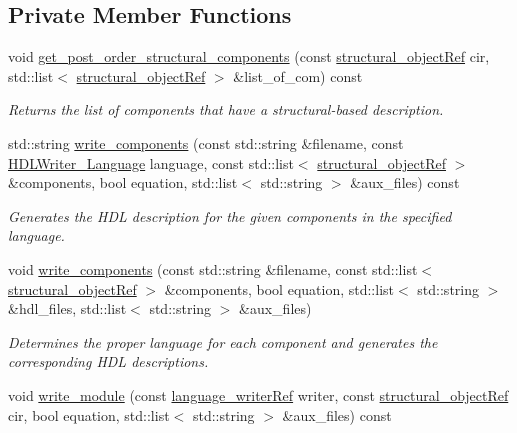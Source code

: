\subsection*{Private Member Functions}
\begin{DoxyCompactItemize}
\item 
void \hyperlink{classHDL__manager_a5f8b1b3812244b35f3d58f639903e3d8}{get\+\_\+post\+\_\+order\+\_\+structural\+\_\+components} (const \hyperlink{structural__objects_8hpp_a8ea5f8cc50ab8f4c31e2751074ff60b2}{structural\+\_\+object\+Ref} cir, std\+::list$<$ \hyperlink{structural__objects_8hpp_a8ea5f8cc50ab8f4c31e2751074ff60b2}{structural\+\_\+object\+Ref} $>$ \&list\+\_\+of\+\_\+com) const
\begin{DoxyCompactList}\small\item\em Returns the list of components that have a structural-\/based description. \end{DoxyCompactList}\item 
std\+::string \hyperlink{classHDL__manager_aaaf408848659946f286bce9799a7da8a}{write\+\_\+components} (const std\+::string \&filename, const \hyperlink{language__writer_8hpp_a890069761ca3ce361c42684c789d886c}{H\+D\+L\+Writer\+\_\+\+Language} language, const std\+::list$<$ \hyperlink{structural__objects_8hpp_a8ea5f8cc50ab8f4c31e2751074ff60b2}{structural\+\_\+object\+Ref} $>$ \&components, bool equation, std\+::list$<$ std\+::string $>$ \&aux\+\_\+files) const
\begin{DoxyCompactList}\small\item\em Generates the H\+DL description for the given components in the specified language. \end{DoxyCompactList}\item 
void \hyperlink{classHDL__manager_a0bc13e709384a03c49b4130be2035c92}{write\+\_\+components} (const std\+::string \&filename, const std\+::list$<$ \hyperlink{structural__objects_8hpp_a8ea5f8cc50ab8f4c31e2751074ff60b2}{structural\+\_\+object\+Ref} $>$ \&components, bool equation, std\+::list$<$ std\+::string $>$ \&hdl\+\_\+files, std\+::list$<$ std\+::string $>$ \&aux\+\_\+files)
\begin{DoxyCompactList}\small\item\em Determines the proper language for each component and generates the corresponding H\+DL descriptions. \end{DoxyCompactList}\item 
void \hyperlink{classHDL__manager_a0e67d86aca71fada08a10096cac3396a}{write\+\_\+module} (const \hyperlink{language__writer_8hpp_ab5bb59a651cbff3f3c83b0f51c0b0b71}{language\+\_\+writer\+Ref} writer, const \hyperlink{structural__objects_8hpp_a8ea5f8cc50ab8f4c31e2751074ff60b2}{structural\+\_\+object\+Ref} cir, bool equation, std\+::list$<$ std\+::string $>$ \&aux\+\_\+files) const

\end{DoxyCompactItemize}
